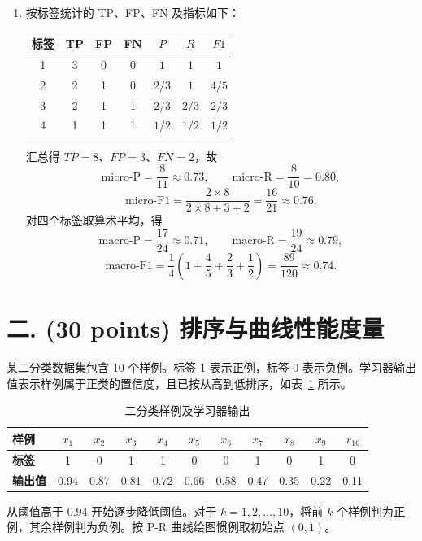 \documentclass[8pt]{article}
\begin{document}
\begin{enumerate}[leftmargin=2.2em,itemsep=0.8em]
\item 按标签统计的 TP、FP、FN 及指标如下：
\begin{center}
\begin{tabular}{c@{\quad}ccc@{\quad}ccc}
\toprule
标签 & TP & FP & FN & $P$ & $R$ & $F1$\\
\midrule
1&3&0&0&$1$&$1$&$1$\\
2&2&1&0&$2/3$&$1$&$4/5$\\
3&2&1&1&$2/3$&$2/3$&$2/3$\\
4&1&1&1&$1/2$&$1/2$&$1/2$\\
\bottomrule
\end{tabular}
\end{center}
汇总得 $TP=8$、$FP=3$、$FN=2$，故
\[
\mathrm{micro\mbox{-}P}=\frac8{11}\approx0.73,\qquad
\mathrm{micro\mbox{-}R}=\frac8{10}=0.80,
\]
\[
\mathrm{micro\mbox{-}F1}=\frac{2\times8}{2\times8+3+2}=\frac{16}{21}\approx0.76.
\]
对四个标签取算术平均，得
\[
\mathrm{macro\mbox{-}P}=\frac{17}{24}\approx0.71,\qquad
\mathrm{macro\mbox{-}R}=\frac{19}{24}\approx0.79,
\]
\[
\mathrm{macro\mbox{-}F1}=\frac14\left(1+\frac45+\frac23+\frac12\right)
=\frac{89}{120}\approx0.74.
\]
\end{enumerate}

\clearpage
\section*{二. (30 points) 排序与曲线性能度量}

某二分类数据集包含 10 个样例。标签 1 表示正例，标签 0 表示负例。学习器输出值表示样例属于正类的置信度，且已按从高到低排序，如表~\ref{tab:scores} 所示。

\begin{table}[H]
\centering\small
\setlength{\tabcolsep}{4.4pt}
\begin{tabular}{l*{10}{c}}
\toprule
\textbf{样例} & $x_1$ & $x_2$ & $x_3$ & $x_4$ & $x_5$ & $x_6$ & $x_7$ & $x_8$ & $x_9$ & $x_{10}$ \\
\midrule
\textbf{标签} & 1 & 0 & 1 & 1 & 0 & 0 & 1 & 0 & 1 & 0 \\
\textbf{输出值} & 0.94 & 0.87 & 0.81 & 0.72 & 0.66 & 0.58 & 0.47 & 0.35 & 0.22 & 0.11 \\
\bottomrule
\end{tabular}
\caption{二分类样例及学习器输出}
\label{tab:scores}
\end{table}

从阈值高于 0.94 开始逐步降低阈值。对于 $k=1,2,\ldots,10$，将前 $k$ 个样例判为正例，其余样例判为负例。按 P-R 曲线绘图惯例取初始点 $(0,1)$。
\end{document}
